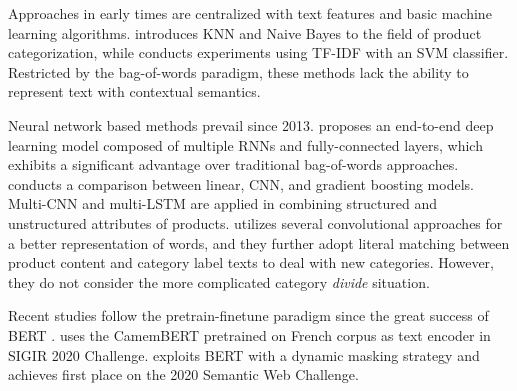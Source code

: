 Approaches in early times are centralized with text features and basic machine learning algorithms. \cite{ding2002goldenbullet} introduces KNN and Naive Bayes to the field of product categorization, while \cite{yu2012product} 
conducts experiments using TF-IDF with an SVM classifier. Restricted by the bag-of-words paradigm, these methods lack the ability to represent text with contextual semantics.

Neural network based methods prevail since 2013. \cite{ha2016large} proposes an end-to-end deep learning model composed of multiple RNNs and fully-connected layers, which exhibits a significant advantage over traditional bag-of-words approaches. 
\cite{das2016large} conducts a comparison between linear, CNN, and gradient boosting models. 
Multi-CNN and multi-LSTM are applied in \cite{krishnan2019large} combining structured and unstructured attributes of products. 
\cite{chen2019fine} utilizes 
several convolutional approaches
for a better representation of words, and they further adopt literal matching between product content and category label texts to deal with new categories. However, they do not consider the more complicated category \textit{divide} situation. 

Recent studies follow the pretrain-finetune paradigm since the great success of BERT \cite{devlin-etal-2019-bert}. 
\cite{lee2020cbb} uses the CamemBERT pretrained on French corpus as text encoder in SIGIR 2020 
Challenge. \cite{yang2020bert} exploits BERT with a dynamic masking strategy and achieves first place on 
the 2020 Semantic Web Challenge.

